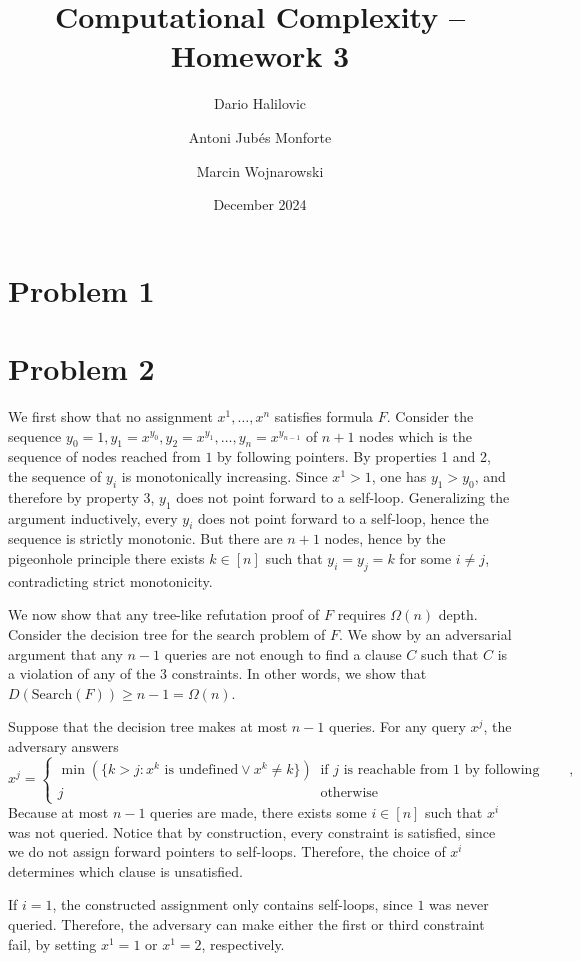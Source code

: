 \documentclass{article}
\title{Computational Complexity -- Homework 3}
\author{Dario Halilovic\and
Antoni Jubés Monforte\and
Marcin Wojnarowski}
\date{December 2024}
\begin{document}
\maketitle

\section*{Problem 1}

\section*{Problem 2}
We first show that no assignment $x^{1}, \ldots, x^{n}$ satisfies formula $F$.
Consider the sequence $y_0 = 1, y_1 = x^{y_0}, y_2 = x^{y_1}, \ldots, y_{n}
= x^{y_{n-1}}$ of $n+1$ nodes which is the sequence of nodes reached from $1$ by
following pointers. By properties 1 and 2, the sequence of $y_i$ is
monotonically increasing. Since $x^1 > 1$, one has $y_1 > y_0$, and therefore by
property 3, $y_1$ does not point forward to a self-loop. Generalizing the
argument inductively, every $y_i$ does not point forward to a self-loop, hence
the sequence is strictly monotonic. But there are $n+1$ nodes, hence by the
pigeonhole principle there exists $k \in [n]$ such that $y_i = y_j = k$ for some
$i \neq j$, contradicting strict monotonicity.

We now show that any tree-like refutation proof of $F$ requires $\Omega(n)$
depth. Consider the decision tree for the search problem of $F$. We show by an
adversarial argument that any $n - 1$ queries are not enough to find a clause
$C$ such that $C$ is a violation of any of the 3 constraints. In other words, we
show that $D(\textrm{Search}(F)) \geq n - 1 = \Omega(n)$.

Suppose that the decision tree makes at most $n - 1$ queries. For any query
$x^{j}$, the adversary answers \[ x^j = \begin{cases} \min(\{k > j : x^k
	\textrm{ is undefined} \lor x^k \neq k\}) & \textrm{if } j \textrm{ is
	reachable from 1 by following pointers}, \\ j     & \textrm{otherwise}
\end{cases} \] Because at most $n - 1$ queries are made, there exists some $i
\in [n]$ such that $x^i$ was not queried. Notice that by construction, every
constraint is satisfied, since we do not assign forward pointers to self-loops.
Therefore, the choice of $x^i$ determines which clause is unsatisfied.

If $i = 1$, the constructed assignment only contains self-loops, since $1$ was
never queried. Therefore, the adversary can make either the first or third
constraint fail, by setting $x^1 = 1$ or $x^1 = 2$, respectively.
\end{document}
